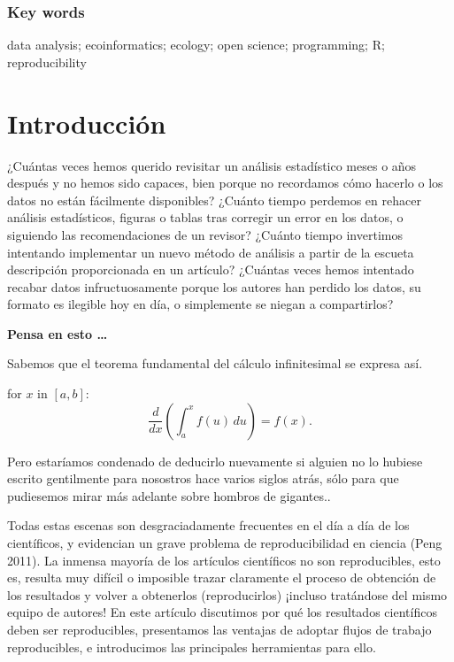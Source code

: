 \documentclass[]{tufte-handout}
\begin{document}
\hypertarget{key-words}{%
\subsubsection{Key words}\label{key-words}}

data analysis; ecoinformatics; ecology; open science; programming; R;
reproducibility

\hypertarget{introducciuxf3n}{%
\section{Introducción}\label{introducciuxf3n}}

¿Cuántas veces hemos querido revisitar un análisis estadístico meses o
años después y no hemos sido capaces, bien porque no recordamos cómo
hacerlo o los datos no están fácilmente disponibles? ¿Cuánto tiempo
perdemos en rehacer análisis estadísticos, figuras o tablas tras
corregir un error en los datos, o siguiendo las recomendaciones de un
revisor? ¿Cuánto tiempo invertimos intentando implementar un nuevo
método de análisis a partir de la escueta descripción proporcionada en
un artículo? ¿Cuántas veces hemos intentado recabar datos
infructuosamente porque los autores han perdido los datos, su formato es
ilegible hoy en día, o simplemente se niegan a compartirlos?

\begin{marginfigure}
\textbf{Pensa en esto \ldots{}}

Sabemos que el teorema fundamental del cálculo infinitesimal se expresa
así.

for \(x\) in \([a, b]\):
\[\frac{d}{dx}\left( \int_{a}^{x} f(u)\,du\right)=f(x).\]

Pero estaríamos condenado de deducirlo nuevamente si alguien no lo
hubiese escrito gentilmente para nosostros hace varios siglos atrás,
sólo para que pudiesemos mirar más adelante sobre hombros de gigantes..
\end{marginfigure}

Todas estas escenas son desgraciadamente frecuentes en el día a día de
los científicos, y evidencian un grave problema de reproducibilidad en
ciencia (Peng 2011). La inmensa mayoría de los artículos científicos no
son reproducibles, esto es, resulta muy difícil o imposible trazar
claramente el proceso de obtención de los resultados y volver a
obtenerlos (reproducirlos) ¡incluso tratándose del mismo equipo de
autores! En este artículo discutimos por qué los resultados científicos
deben ser reproducibles, presentamos las ventajas de adoptar flujos de
trabajo reproducibles, e introducimos las principales herramientas para
ello.
\end{document}
